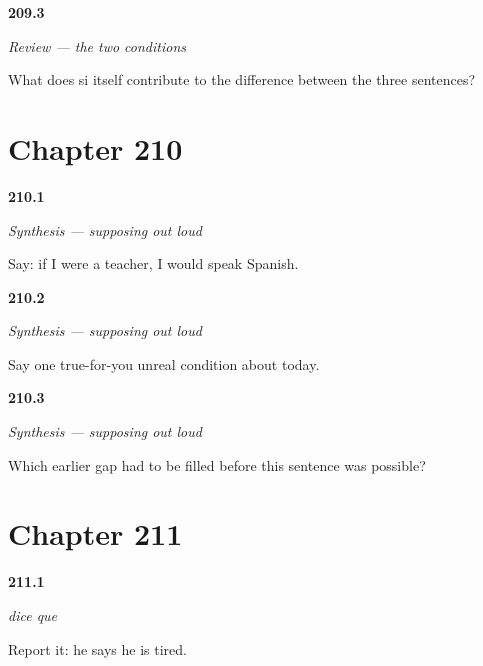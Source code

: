 \noindent\begin{minipage}[t]{\linewidth}
\raggedright
\hypertarget{review-ES-C56-repaso-condiciones-si}{\textbf{209.3}} \emph{Review — the two conditions}\par
\small What does si itself contribute to the difference between the three sentences?
\end{minipage}\par\medskip

\section*{Chapter 210}

\noindent\begin{minipage}[t]{\linewidth}
\raggedright
\hypertarget{review-ES-C56-sintesis-condiciones-ser}{\textbf{210.1}} \emph{Synthesis — supposing out loud}\par
\small Say: if I were a teacher, I would speak Spanish.
\end{minipage}\par\medskip

\noindent\begin{minipage}[t]{\linewidth}
\raggedright
\hypertarget{review-ES-C56-sintesis-condiciones-own}{\textbf{210.2}} \emph{Synthesis — supposing out loud}\par
\small Say one true-for-you unreal condition about today.
\end{minipage}\par\medskip

\noindent\begin{minipage}[t]{\linewidth}
\raggedright
\hypertarget{review-ES-C56-sintesis-condiciones-cost}{\textbf{210.3}} \emph{Synthesis — supposing out loud}\par
\small Which earlier gap had to be filled before this sentence was possible?
\end{minipage}\par\medskip

\section*{Chapter 211}

\noindent\begin{minipage}[t]{\linewidth}
\raggedright
\hypertarget{review-ES-C57-dice-que-build}{\textbf{211.1}} \emph{dice que}\par
\small Report it: he says he is tired.
\end{minipage}\par\medskip

